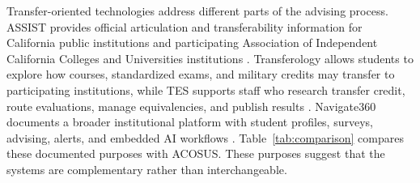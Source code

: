 \documentclass[letterpaper,11pt]{article}
\begin{document}
Transfer-oriented technologies address different parts of the advising process. ASSIST provides official articulation and transferability information for California public institutions and participating Association of Independent California Colleges and Universities institutions \parencite{assistResource2026}. Transferology allows students to explore how courses, standardized exams, and military credits may transfer to participating institutions, while TES supports staff who research transfer credit, route evaluations, manage equivalencies, and publish results \parencite{transferologySupport2026,collegeSourceTES2026}. Navigate360 documents a broader institutional platform with student profiles, surveys, advising, alerts, and embedded AI workflows \parencite{navigate3602026}. Table~\ref{tab:comparison} compares these documented purposes with ACOSUS. These purposes suggest that the systems are complementary rather than interchangeable.
\end{document}
